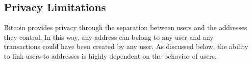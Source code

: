 \subsection{Privacy Limitations}

Bitcoin provides privacy through the separation between users and the addresses they control. In this way, any address can belong to any user and any transactions could have been created by any user. As discussed below, the ability to link users to addresses is highly dependent on the behavior of users.